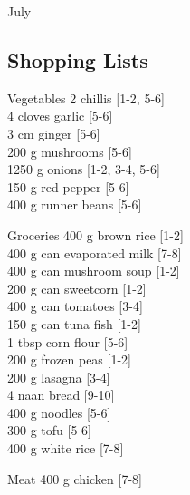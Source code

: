 \begin{menu}{July}
    \subsection*{Shopping Lists}
      \begin{shoppinglist}{Vegetables}
      2  chillis 
        {\scriptsize[1-2, 5-6]}\\
      4 cloves garlic 
        {\scriptsize[5-6]}\\
      3 cm ginger 
        {\scriptsize[5-6]}\\
      200 g mushrooms 
        {\scriptsize[5-6]}\\
      1250 g onions 
        {\scriptsize[1-2, 3-4, 5-6]}\\
      150 g red pepper 
        {\scriptsize[5-6]}\\
      400 g runner beans 
        {\scriptsize[5-6]}\\
      \end{shoppinglist}%
      \begin{shoppinglist}{Groceries}
      400 g brown rice 
        {\scriptsize[1-2]}\\
      400 g can evaporated milk 
        {\scriptsize[7-8]}\\
      400 g can mushroom soup 
        {\scriptsize[1-2]}\\
      200 g can sweetcorn 
        {\scriptsize[1-2]}\\
      400 g can tomatoes 
        {\scriptsize[3-4]}\\
      150 g can tuna fish 
        {\scriptsize[1-2]}\\
      1 tbsp corn flour 
        {\scriptsize[5-6]}\\
      200 g frozen peas 
        {\scriptsize[1-2]}\\
      200 g lasagna 
        {\scriptsize[3-4]}\\
      4  naan bread 
        {\scriptsize[9-10]}\\
      400 g noodles 
        {\scriptsize[5-6]}\\
      300 g tofu 
        {\scriptsize[5-6]}\\
      400 g white rice 
        {\scriptsize[7-8]}\\
      \end{shoppinglist}%
      \par\vfil %
      \begin{shoppinglist}{Meat}
      400 g chicken 
        {\scriptsize[7-8]}\\

\end{shoppinglist}
\end{menu}
